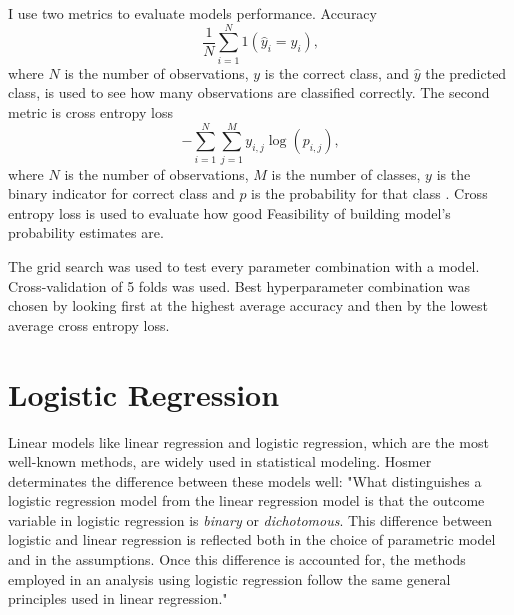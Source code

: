 I use two metrics to evaluate models performance. Accuracy
\begin{equation}
    \frac { 1 } { N} \sum _ { i = 1 } ^ {N} 1 \left( \hat { y } _ { i } = y _ { i } \right)\text{,}
\end{equation}
where $N$ is the number of observations, $y$ is the correct class, and $\hat { y }$ the predicted class, is used to see how many observations are classified correctly. The second metric is cross entropy loss
\begin{equation}
    - \sum _ { i = 1 } ^ { N }\sum _ { j = 1 } ^ { M } y _ { i,j } \log \left( p _ { i,j } \right) \text{,}
\end{equation}
where $N$ is the number of observations, $M$ is the number of classes, $y$ is the binary indicator for correct class and $p$ is the probability for that class \cite{nasrabadi2007pattern}. Cross entropy loss is used to evaluate how good Feasibility of building model's probability estimates are.

The grid search was used to test every parameter combination with a model. Cross-validation of 5 folds was used. Best hyperparameter combination was chosen by looking first at the highest average accuracy and then by the lowest average cross entropy loss.

\section{Logistic Regression}
Linear models like linear regression and logistic regression, which are the most well-known methods, are widely used in statistical modeling. Hosmer\cite{hosmer2013applied} determinates the difference between these models well: "What distinguishes a logistic regression model from the linear regression model is that the outcome variable in logistic regression is \textit{binary} or \textit{dichotomous}. This difference between logistic and linear regression is reflected both in the choice of parametric model and in the assumptions. Once this difference is accounted for, the methods employed in an analysis using logistic regression follow the same general principles used in linear regression."

